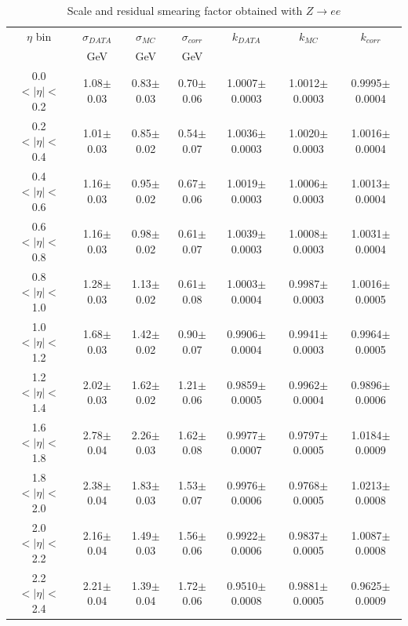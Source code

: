 \begin{table}[htbp]
  \begin{center}
\begin{sideways}
    \begin{tabular}{ccccccc}
\toprule
$\eta$ bin & $\sigma_{DATA}$ &  $\sigma_{MC}$ & $\sigma_{corr}$ & $k_{DATA}$ &  $k_{MC}$ & $k_{corr}$ \\
&GeV &GeV &GeV & & & \\
\midrule
0.0$<|\eta|<$0.2 &1.08$\pm$ 0.03 & 0.83$\pm$ 0.03 & 0.70$\pm$ 0.06 & 1.0007$\pm$ 0.0003 & 1.0012$\pm$ 0.0003 & 0.9995$\pm$ 0.0004 \\ 
0.2$<|\eta|<$0.4 &1.01$\pm$ 0.03 & 0.85$\pm$ 0.02 & 0.54$\pm$ 0.07 & 1.0036$\pm$ 0.0003 & 1.0020$\pm$ 0.0003 & 1.0016$\pm$ 0.0004 \\ 
0.4$<|\eta|<$0.6 &1.16$\pm$ 0.03 & 0.95$\pm$ 0.02 & 0.67$\pm$ 0.06 & 1.0019$\pm$ 0.0003 & 1.0006$\pm$ 0.0003 & 1.0013$\pm$ 0.0004 \\ 
0.6$<|\eta|<$0.8 &1.16$\pm$ 0.03 & 0.98$\pm$ 0.02 & 0.61$\pm$ 0.07 & 1.0039$\pm$ 0.0003 & 1.0008$\pm$ 0.0003 & 1.0031$\pm$ 0.0004 \\ 
0.8$<|\eta|<$1.0 &1.28$\pm$ 0.03 & 1.13$\pm$ 0.02 & 0.61$\pm$ 0.08 & 1.0003$\pm$ 0.0004 & 0.9987$\pm$ 0.0003 & 1.0016$\pm$ 0.0005 \\ 
1.0$<|\eta|<$1.2 &1.68$\pm$ 0.03 & 1.42$\pm$ 0.02 & 0.90$\pm$ 0.07 & 0.9906$\pm$ 0.0004 & 0.9941$\pm$ 0.0003 & 0.9964$\pm$ 0.0005 \\ 
1.2$<|\eta|<$1.4 &2.02$\pm$ 0.03 & 1.62$\pm$ 0.02 & 1.21$\pm$ 0.06 & 0.9859$\pm$ 0.0005 & 0.9962$\pm$ 0.0004 & 0.9896$\pm$ 0.0006 \\ 
1.6$<|\eta|<$1.8 &2.78$\pm$ 0.04 & 2.26$\pm$ 0.03 & 1.62$\pm$ 0.08 & 0.9977$\pm$ 0.0007 & 0.9797$\pm$ 0.0005 & 1.0184$\pm$ 0.0009 \\ 
1.8$<|\eta|<$2.0 &2.38$\pm$ 0.04 & 1.83$\pm$ 0.03 & 1.53$\pm$ 0.07 & 0.9976$\pm$ 0.0006 & 0.9768$\pm$ 0.0005 & 1.0213$\pm$ 0.0008 \\ 
2.0$<|\eta|<$2.2 &2.16$\pm$ 0.04 & 1.49$\pm$ 0.03 & 1.56$\pm$ 0.06 & 0.9922$\pm$ 0.0006 & 0.9837$\pm$ 0.0005 & 1.0087$\pm$ 0.0008 \\ 
2.2$<|\eta|<$2.4 &2.21$\pm$ 0.04 & 1.39$\pm$ 0.04 & 1.72$\pm$ 0.06 & 0.9510$\pm$ 0.0008 & 0.9881$\pm$ 0.0005 & 0.9625$\pm$ 0.0009 \\ 
\bottomrule
    \end{tabular}
\end{sideways}
    \caption{\label{tab:ResCorr}Scale and residual smearing factor obtained with $Z\rightarrow ee$ }
  \end{center}
\end{table}

